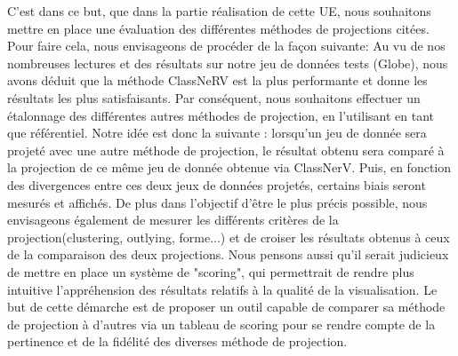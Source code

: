 \medskip
C'est dans ce but, que dans la partie réalisation de cette UE, nous souhaitons mettre en place une évaluation des différentes méthodes de projections citées.
Pour faire cela, nous envisageons de procéder de la façon suivante: \newline
Au vu de nos nombreuses lectures et  des résultats sur notre jeu de données tests (Globe), nous avons déduit que la méthode ClassNeRV est la plus performante et donne les résultats les plus satisfaisants. 
Par conséquent, nous souhaitons effectuer un étalonnage des différentes autres méthodes de projection, en l'utilisant en tant que référentiel. \newline
Notre idée est donc la suivante : lorsqu'un jeu de donnée sera projeté avec une autre méthode de projection, 
le résultat obtenu sera comparé à la projection de ce même jeu de donnée obtenue via ClassNerV.
Puis, en fonction des divergences entre ces deux jeux de données projetés, certains biais seront mesurés et affichés.
De plus dans l'objectif d'être le plus précis possible, nous envisageons également de mesurer les différents critères de la projection(clustering, outlying, forme...) et de croiser les résultats obtenus à ceux de la comparaison des deux projections.
Nous pensons aussi qu'il serait judicieux de mettre en place un système de "scoring", qui permettrait de rendre plus intuitive l'appréhension des résultats relatifs à la qualité de la visualisation. 
\newline 
Le but de cette démarche est de proposer un outil capable de comparer sa méthode de projection à d'autres via un tableau de scoring pour se rendre compte de la pertinence et de la fidélité des diverses méthode de projection.

\medskip

